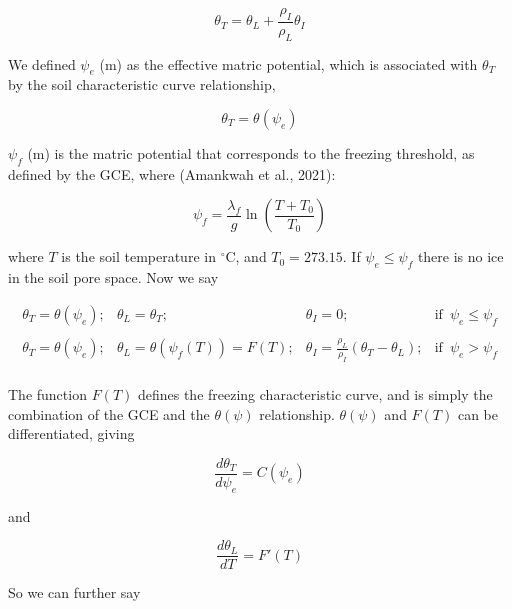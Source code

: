 \documentclass[10pt,a4paper]{article}
\begin{document}
\begin{equation}
	\theta_T=\theta_L+\frac{\rho_I}{\rho_L}\theta_I
\end{equation}

We defined $\psi_e$ (m) as the effective matric potential, which is associated with $\theta_T$ by the soil characteristic curve relationship, 

\begin{equation}
	\theta_T=\theta(\psi_e)
\end{equation}

$\psi_f$ (m) is the matric potential that corresponds to the freezing threshold, as defined by the GCE, where (Amankwah et al., 2021):

\begin{equation}
	\psi_f=\frac{\lambda_f}{g}\ln\left(\frac{T+T_0}{T_0}\right)
\end{equation}

where $T$ is the soil temperature in $^\circ$C, and $T_0 = 273.15$. If $\psi_e\leq\psi_f$ there is no ice in the soil pore space. Now we say 

\begin{equation}
	\begin{array}{llll}
		\theta_T=\theta(\psi_e); & \theta_L=\theta_T; & \theta_I = 0; & \mathrm{if}\hspace{6pt} \psi_e\leq\psi_f\\
		\\
		\theta_T=\theta(\psi_e); & \theta_L=\theta(\psi_f(T))=F(T); & \theta_I = \frac{\rho_L}{\rho_I}(\theta_T-\theta_L); & \mathrm{if}\hspace{6pt} \psi_e>\psi_f\\
	\end{array}
\end{equation}

The function $F(T)$ defines the freezing characteristic curve, and is simply the combination of the GCE and the $\theta(\psi)$ relationship. $\theta(\psi)$ and $F(T)$ can be differentiated, giving

\begin{equation}
	\frac{d\theta_T}{d\psi_e}=C(\psi_e)
\end{equation}

and

\begin{equation}
	\frac{d\theta_{L}}{dT}=F'(T)
\end{equation}

So we can further say
\end{document}
